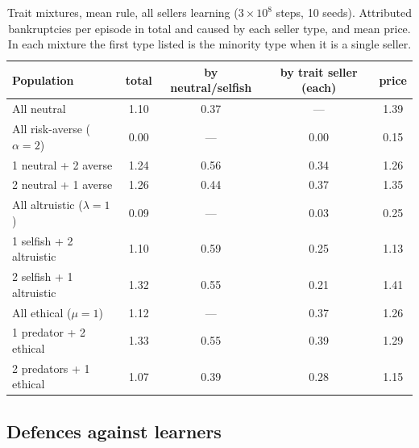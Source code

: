 \documentclass{article}
\begin{document}
\begin{table}[t]
\centering
\caption{Trait mixtures, mean rule, all sellers learning ($3\times10^8$ steps, 10 seeds). Attributed bankruptcies per episode in total and caused by each seller type, and mean price. In each mixture the first type listed is the minority type when it is a single seller.}
\label{tab:mix}
\small
\begin{tabular}{@{}lcccc@{}}
\toprule
Population & total & by neutral/selfish & by trait seller (each) & price \\
\midrule
All neutral & 1.10 & 0.37 & --- & 1.39 \\
All risk-averse ($\alpha=2$) & 0.00 & --- & 0.00 & 0.15 \\
1 neutral + 2 averse & 1.24 & 0.56 & 0.34 & 1.26 \\
2 neutral + 1 averse & 1.26 & 0.44 & 0.37 & 1.35 \\
All altruistic ($\lambda=1$) & 0.09 & --- & 0.03 & 0.25 \\
1 selfish + 2 altruistic & 1.10 & 0.59 & 0.25 & 1.13 \\
2 selfish + 1 altruistic & 1.32 & 0.55 & 0.21 & 1.41 \\
All ethical ($\mu=1$) & 1.12 & --- & 0.37 & 1.26 \\
1 predator + 2 ethical & 1.33 & 0.55 & 0.39 & 1.29 \\
2 predators + 1 ethical & 1.07 & 0.39 & 0.28 & 1.15 \\
\bottomrule
\end{tabular}
\end{table}

\subsection{Defences against learners}
\label{sec:defences}
\end{document}
